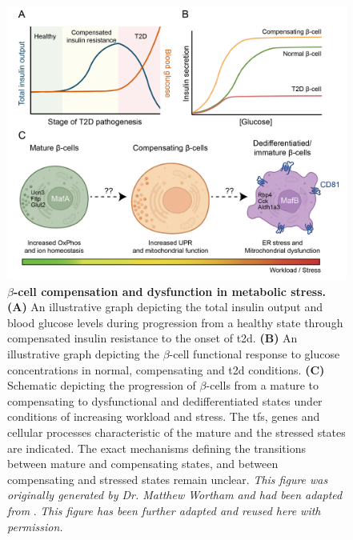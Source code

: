 \begin{figure}[H]
    \centering
    \includegraphics[width=\linewidth]{Chapter1/Fig/F1-17-01.png}
    \caption[$\beta$-cell compensation and dysfunction in metabolic stress]{\textbf{$\beta$-cell compensation and dysfunction in metabolic stress.} \textbf{(A)} An illustrative graph depicting the total insulin output and blood glucose levels during progression from a healthy state through compensated insulin resistance to the onset of \gls{t2d}. \textbf{(B)} An illustrative graph depicting the $\beta$-cell functional response to glucose concentrations in normal, compensating and \gls{t2d} conditions. \textbf{(C)} Schematic depicting the progression of $\beta$-cells from a mature to compensating to dysfunctional and dedifferentiated states under conditions of increasing workload and stress. The \glspl{tf}, genes and cellular processes characteristic of the mature and the stressed states are indicated. The exact mechanisms defining the transitions between mature and compensating states, and between compensating and stressed states remain unclear. \textit{This figure was originally generated by Dr. Matthew Wortham and had been adapted from} \textbf{\cite{defronzo_triumvirate_2009,ferrannini_stunned_2010,avrahami_single-cell_2020,sachs_targeted_2020,salinno_cd81_2021,hrovatin_delineating_2023}}. \textit{This figure has been further adapted and reused here with permission.}}
    \label{fig:chp1_adaptstress}
\end{figure}


